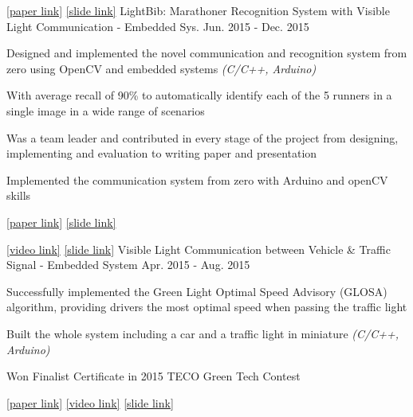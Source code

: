\documentclass[13pt, a4paper]{awesome-cv}
\begin{document}
\begin{cventries}
    \cventry
        {
            \href{http://ieeexplore.ieee.org/document/7396559}{[paper link]}
            \href{http://www.slideshare.net/joannelovecat/lightbib-marathoner-recognition-system-with-visible-light-communications}{[slide link]}
        }
        {LightBib: Marathoner Recognition System with Visible Light Communication - Embedded Sys.}
        {}
        {Jun. 2015 - Dec. 2015}
        {
        \begin{cvitems}
            \item {Designed and implemented the novel communication and recognition system from zero using OpenCV and embedded systems \textit{(C/C++, Arduino)}}
            \item {With average recall of 90\% to automatically identify each of the 5 runners in a single image in a wide range of scenarios}
            \item {Was a team leader and contributed in every stage of the project from designing, implementing and evaluation to writing paper and presentation}
                \item {Implemented the communication system from zero with Arduino and openCV skills  }
            \item {
                \href{http://ieeexplore.ieee.org/document/7396559}{[paper link]}
                    \href{http://www.slideshare.net/joannelovecat/lightbib-marathoner-recognition-system-with-visible-light-communications}{[slide link]}
                }
        \end{cvitems}
        }
        
    \cventry
        {
            \href{https://www.youtube.com/watch?v=ase3DLZJ1jU}{[video link]}
            \href{https://www.slideshare.net/joannelovecat/to-ppass-or-not-to-pass}{[slide link]}
        }
        {Visible Light Communication between Vehicle \& Traffic Signal - Embedded System}
        {}
        {Apr. 2015 - Aug. 2015}
        {
        \begin{cvitems}
            \item {Successfully implemented the Green Light Optimal Speed Advisory (GLOSA) algorithm, providing drivers the most optimal speed when passing the traffic light}
            \item {Built the whole system including a car and a traffic light in miniature \textit{(C/C++, Arduino)}}
            \item {Won Finalist Certificate in 2015 TECO Green Tech Contest}
        \end{cvitems}
        }
        \item {
            \href{http://dl.acm.org/citation.cfm?id=2801079}{[paper link]} 
            \href{https://www.youtube.com/watch?v=6HaaTlJPmUo}{[video link]}
            \href{http://peng.cse.ohio-state.edu/VLCS-2015/slides/s2p3.pptx}{[slide link]}
        }
\end{cventries}
\end{document}
